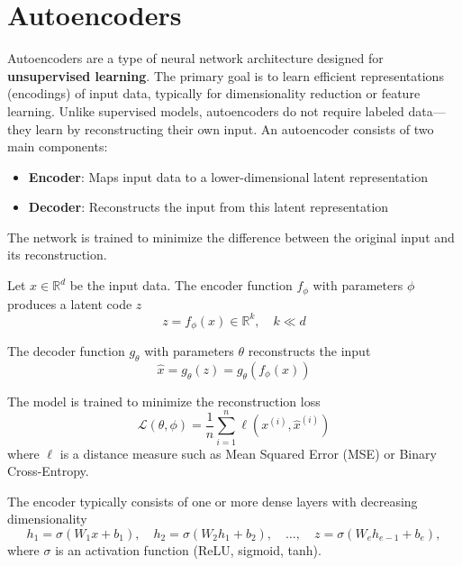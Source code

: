\section{Autoencoders\label{Sec:DR:AE}}
Autoencoders are a type of neural network architecture designed for \textbf{unsupervised learning}. The primary goal is to learn efficient representations (encodings) of input data, typically for dimensionality reduction or feature learning. Unlike supervised models, autoencoders do not require labeled data—they learn by reconstructing their own input.  An autoencoder consists of two main components:
\begin{itemize}
	\item \textbf{Encoder}: Maps input data to a lower-dimensional latent representation
	\item \textbf{Decoder}: Reconstructs the input from this latent representation
\end{itemize}

The network is trained to minimize the difference between the original input and its reconstruction.


Let $x \in \mathbb{R}^d$ be the input data. The encoder function $f_\phi$ with parameters $\phi$ produces a latent code $z$
\[
z = f_\phi(x) \in \mathbb{R}^k, \quad k \ll d
\]

The decoder function $g_\theta$ with parameters $\theta$ reconstructs the input
\[
\hat{x} = g_\theta(z) = g_\theta(f_\phi(x))
\]

The model is trained to minimize the reconstruction loss
\[
\mathcal{L}(\theta, \phi) = \frac{1}{n} \sum_{i=1}^n \ell(x^{(i)}, \hat{x}^{(i)})
\]
where $\ell$ is a distance measure such as Mean Squared Error (MSE) or Binary Cross-Entropy.


The encoder typically consists of one or more dense layers with decreasing dimensionality
\[
h_1 = \sigma(W_1 x + b_1), \quad h_2 = \sigma(W_2 h_1 + b_2), \quad \dots, \quad z = \sigma(W_e h_{e-1} + b_e),
\]
where $\sigma$ is an activation function (ReLU, sigmoid, tanh).

